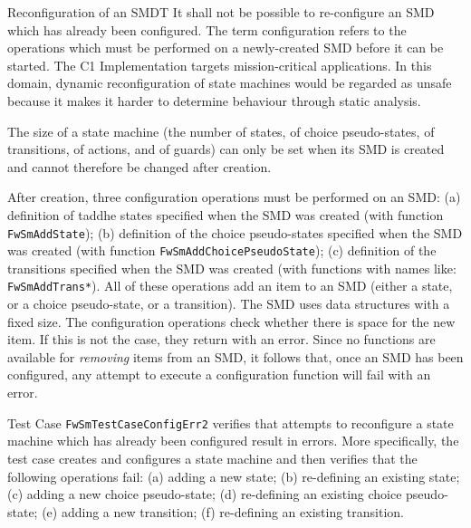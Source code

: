 \documentclass[requirements]{../fwprofile}
\begin{document}
\begin{fw_req_note}{Reconfiguration of an SMD}{T}
{It shall not be possible to re-configure an SMD which has already been configured.}
{The term configuration refers to the operations which must be performed on a newly-created SMD before it can be started.}
{ The C1 Implementation targets mission-critical applications. 
In this domain, dynamic reconfiguration of state machines would be regarded as unsafe 
because it makes it harder to determine behaviour through static analysis.}
{ The size of a state machine (the number of states, of choice pseudo-states, of transitions, of actions, and of guards) can only be set when its SMD is created and cannot therefore be changed after creation. 

After creation, three configuration operations must be performed on an SMD: (a) definition of taddhe states specified when the SMD was created (with function \texttt{FwSmAddState}); 
(b) definition of the choice pseudo-states specified when the SMD was created (with function \texttt{FwSmAddChoicePseudoState}); 
(c) definition of the transitions specified when the SMD was created (with functions with names like: \texttt{FwSmAddTrans*}). 
All of these operations add an item to an SMD (either a state, or a choice pseudo-state, 
or a transition). 
The SMD uses data structures with a fixed size. The configuration operations 
check whether there is space for the new item. 
If this is not the case, they return with an error. Since no functions are available 
for \emph{removing} items from an SMD, it follows that, once an SMD has been configured, 
any attempt to execute a configuration function will fail with an error.} 
{Test Case \texttt{FwSmTestCaseConfigErr2} verifies that attempts to 
reconfigure a state machine which has already been configured result in errors. 
More specifically, the test case creates and configures a state machine and then verifies 
that the following operations fail: (a) adding a new state; (b) re-defining an existing state; 
(c) adding a new choice pseudo-state; (d) re-defining an existing choice pseudo-state; 
(e) adding a new transition; (f) re-defining an existing transition.}
\end{fw_req_note}
\end{document}
